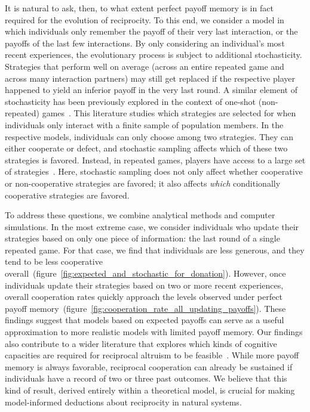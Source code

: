 \documentclass[11pt]{article}
\newcommand{\FigBaseResults}{figure~\ref{fig:expected_and_stochastic_for_donation}}
\newcommand{\FigHigherMemory}{figure~\ref{fig:cooperation_rate_all_updating_payoffs}}
\theoremstyle{plainCl1}
\theoremstyle{plainCl2}
\begin{document}
It is natural to ask, then, to what extent perfect payoff memory is in fact required for the evolution of reciprocity. 
To this end, we consider a model in which individuals only remember the payoff of their very last interaction, or the payoffs of the last few interactions. 
By only considering an individual's most recent experiences, the evolutionary process is subject to additional stochasticity. 
Strategies that perform well on average (across an entire repeated game and across many interaction partners) may still get replaced if the respective player happened to yield an inferior payoff in the very last round. 
A similar element of stochasticity has been previously explored in the context of one-shot (non-repeated) games~\citep{sanchez:JTB:2005,roca:PhysicalReview:2006,Traulsen:JTB:2007,Woelfing:JTB:2009,Hauert:PRE:2018}. 
This literature studies which strategies are selected for when individuals only interact with a finite sample of population members. 
In the respective models, individuals can only choose among two strategies. 
They can either cooperate or defect, and stochastic sampling affects which of these two strategies is favored. 
Instead, in repeated games, players have access to a large set of strategies~\citep[in our case, all reactive strategies;][]{nowak:APC:1989}. 
Here, stochastic sampling does not only affect whether cooperative or non-cooperative strategies are favored; it also affects {\it which} conditionally cooperative strategies are favored. 

To address these questions, we combine analytical methods and computer simulations. 
In the most extreme case, we consider individuals who update their strategies based on only one piece of information:  the last round of a single repeated game. 
For that case, we find that individuals are less generous, and they tend to be less cooperative overall~(\FigBaseResults). 
However, once individuals update their strategies based on two or more recent experiences, overall cooperation rates quickly approach the levels observed under perfect payoff memory~(\FigHigherMemory). 
These findings suggest that models based on expected payoffs can serve as a useful approximation to more realistic models with limited payoff memory. 
Our findings also contribute to a wider literature that explores which kinds of cognitive capacities are required for reciprocal altruism to be feasible~\citep[e.g.,][]{Stevens:fip:2011,Volstorf:PlosOne:2011}. 
While more payoff memory is always favorable, reciprocal cooperation can already be sustained if individuals have a record of two or three past outcomes. We believe that this kind of result, derived entirely within a theoretical model, is crucial for making model-informed deductions about reciprocity in natural systems.
\end{document}
